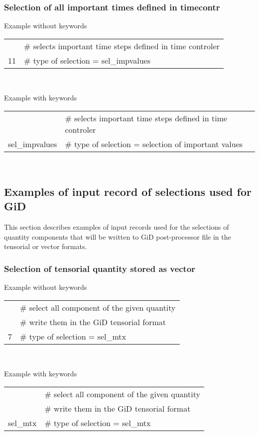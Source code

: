 \subsubsection{Selection of all important times defined in {\sf timecontr}}
Example without keywords
\begin{center}
\begin{tabular}{|ll|}
\hline
   & \# selects important time steps defined in time controler \\
11 & \# type of selection = sel\_impvalues                     \\
\hline
\end{tabular}\\
\end{center}
Example with keywords
\begin{center}
\begin{tabular}{|ll|}
\hline
               & \# selects important time steps defined in time controler \\
sel\_impvalues & \# type of selection = selection of important values      \\
\hline
\end{tabular}\\
\end{center}

\subsection{Examples of input record of selections used for GiD} \label{gidsel_ex}
This section describes examples of input records used for the selections of 
quantity components that will be written to GiD post-processor file in the tensorial 
or vector formats.



\subsubsection{Selection of tensorial quantity stored as vector}
\noindent Example without keywords
\begin{center}
\begin{tabular}{|ll|}
\hline
   & \# select all component of the given quantity \\
   & \# write them in the GiD tensorial format     \\
7  & \# type of selection = sel\_mtx               \\
\hline
\end{tabular}\\
\end{center}
Example with keywords
\begin{center}
\begin{tabular}{|ll|}
\hline
         & \# select all component of the given quantity \\
         & \# write them in the GiD tensorial format     \\
sel\_mtx  & \# type of selection = sel\_mtx               \\
\hline
\end{tabular}\\
\end{center}



